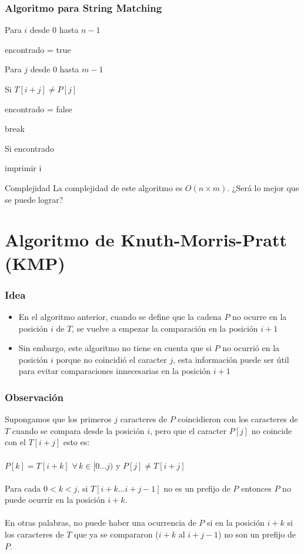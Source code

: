 \documentclass{beamer}
\begin{document}
	\begin{frame}
		\frametitle{Algoritmo para String Matching}
		\begin{enumerate}
			\item Para $i$ desde 0 hasta $n-1$
			\item encontrado = true
			{\setlength\itemindent{15pt} \item Para $j$ desde 0 hasta $m-1$}
			{\setlength\itemindent{30pt} \item Si $T[i + j] \neq P[j]$} 
			{\setlength\itemindent{45pt} \item encontrado = false}
			{\setlength\itemindent{45pt} \item break}
			\item Si encontrado
			{\setlength\itemindent{15pt} \item imprimir i}
		\end{enumerate}
		\pause
		\begin{alertblock}{Complejidad}
			La complejidad de este algoritmo es $O(n \times m)$. ¿Será lo mejor que se puede lograr?
		\end{alertblock}
	\end{frame}
	
\section[KMP]{Algoritmo de Knuth-Morris-Pratt (KMP)}
	\begin{frame}
		\frametitle{Idea}
		\begin{itemize}
			\item En el algoritmo anterior, cuando se define que la cadena $P$ no ocurre en la posición $i$ de $T$, se vuelve a empezar la comparación en la posición $i+1$
			\item Sin embargo, este algoritmo no tiene en cuenta que si $P$ no ocurrió en la posición $i$ porque no coincidió el caracter $j$, esta información puede ser útil para evitar comparaciones innecesarias en la posición $i+1$
		\end{itemize}
	\end{frame}
	
	\begin{frame}
		\frametitle{Observación}
		Supongamos que los primeros $j$ caracteres de $P$ coincidieron con los caracteres de $T$ cuando se compara desde la posición $i$, pero que el caracter $P[j]$ no coincide con el $ T[i + j]$ esto es:\\ \quad \\
		$P[k] = T[i+k] \,\, \forall \, k \in [0 \ldots j)$ \quad y \quad $P[j] \neq T[i+j]$\\ \quad \\
		Para cada $0 < k < j$, si $T[i+k \ldots i + j - 1]$ no es un prefijo de $P$ entonces $P$ no puede ocurrir en la posición $i+k$. \\ \quad \\
		En otras palabras, no puede haber una ocurrencia de $P$ si en la posición $i+k$ si los caracteres de $T$ que ya se compararon ($i+k$ al $i+j-1$) no son un prefijo de $P$.
	\end{frame}
	
\end{document}
